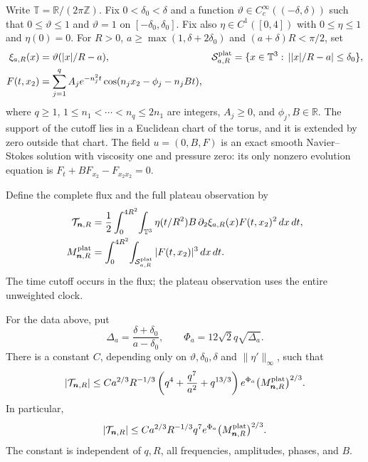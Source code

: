 Write $\mathbb T=\mathbb R/(2\pi\mathbb Z)$.  Fix
$0<\delta_0<\delta$ and a function
$\vartheta\in C_c^\infty((-\delta,\delta))$ such that
$0\le\vartheta\le1$ and $\vartheta=1$ on $[-\delta_0,\delta_0]$.
Fix also $\eta\in C^1([0,4])$ with
$0\le\eta\le1$ and $\eta(0)=0$.
For $R>0$, $a\ge\max(1,\delta+2\delta_0)$ and $(a+\delta)R<\pi/2$, set
\begin{align}
 \xi_{a,R}(x)&=\vartheta(|x|/R-a),&
 \mathcal S^{\rm plat}_{a,R}
 &=\{x\in\mathbb T^3:\,||x|/R-a|\le\delta_0\},
 \label{eq:ub-geometry}\\
 F(t,x_2)&=\sum_{j=1}^q A_je^{-n_j^2t}
                   \cos(n_jx_2-\phi_j-n_jBt),
 \label{eq:ub-F}
\end{align}
where $q\ge1$, $1\le n_1<\cdots<n_q\le2n_1$ are integers,
$A_j\ge0$, and $\phi_j,B\in\mathbb R$.
The support of the cutoff lies in a Euclidean chart of the torus, and it
is extended by zero outside that chart.  The field $u=(0,B,F)$ is an exact
smooth Navier--Stokes solution with viscosity one and pressure zero:
its only nonzero evolution equation is
$F_t+BF_{x_2}-F_{x_2x_2}=0$.

Define the complete flux and the full plateau observation by
\begin{align}
 \mathcal T_{\boldsymbol n,R}
 &=\frac12\int_0^{4R^2}\!\int_{\mathbb T^3}
       \eta(t/R^2)B\,\partial_2\xi_{a,R}(x)F(t,x_2)^2\,dx\,dt,
 \label{eq:ub-T}\\
 M^{\rm plat}_{\boldsymbol n,R}
 &=\int_0^{4R^2}\!\int_{\mathcal S^{\rm plat}_{a,R}}
                         |F(t,x_2)|^3\,dx\,dt.
 \label{eq:ub-M}
\end{align}
The time cutoff occurs in the flux; the plateau observation uses the
entire unweighted clock.

\begin{theorem}\label{thm:ub-flux}
For the data above, put
\[
 \Delta_a=\frac{\delta+\delta_0}{a-\delta_0},\qquad
 \Phi_a=12\sqrt2q\sqrt{\Delta_a}.
\]
There is a constant $C$, depending only on
$\vartheta,\delta_0,\delta$ and $\|\eta'\|_\infty$, such that
\begin{equation}\label{eq:ub-main-refined}
 |\mathcal T_{\boldsymbol n,R}|
 \le C a^{2/3}R^{-1/3}
       \left(q^4+\frac{q^7}{a^2}+q^{13/3}\right)e^{\Phi_a}
       \bigl(M^{\rm plat}_{\boldsymbol n,R}\bigr)^{2/3}.
\end{equation}
In particular,
\begin{equation}\label{eq:ub-main}
 |\mathcal T_{\boldsymbol n,R}|
 \le C a^{2/3}R^{-1/3}q^7e^{\Phi_a}
       \bigl(M^{\rm plat}_{\boldsymbol n,R}\bigr)^{2/3}.
\end{equation}
The constant is independent of $q,R$, all frequencies, amplitudes,
phases, and $B$.
\end{theorem}

